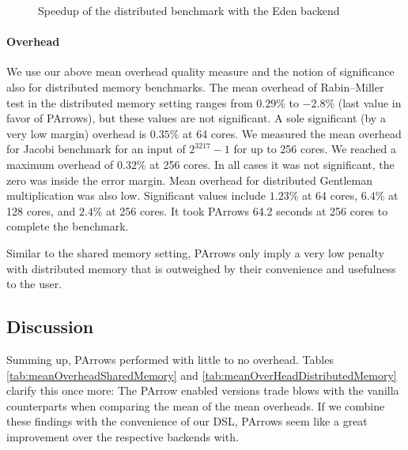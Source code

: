 \begin{figure}[ht]
	\centering
	\caption[Speedup distributed Rabin Miller]{Speedup of the distributed \rmtest benchmark with the Eden backend}
	\label{fig:rabinMillerDistSpeedup}
\end{figure}

\paragraph{Overhead}
We use our above mean overhead quality measure and the notion of significance also for distributed memory benchmarks. The mean overhead of Rabin–Miller test in the distributed memory setting ranges from $0.29\%$ to $-2.8\%$ (last value in favor of PArrows), but these values are not significant. A sole significant (by a very low margin) overhead is $0.35\%$ at 64 cores.
We measured the mean overhead for Jacobi benchmark for an input of $2^{3217}-1$ for up to 256 cores. We reached a maximum overhead of $0.32\%$ at 256 cores. In all cases it was not significant, the zero was inside the error margin.
Mean overhead for distributed Gentleman multiplication was also low. Significant values include $1.23\%$ at 64 cores, $6.4\%$ at 128 cores, and $2.4\%$ at 256 cores. It took PArrows 64.2 seconds at 256 cores to complete the benchmark.

Similar to the shared memory setting, PArrows only imply a very low penalty with distributed memory that is outweighed by their convenience and usefulness to the user.

\subsection{Discussion}



Summing up, PArrows performed with little to no overhead. Tables \ref{tab:meanOverheadSharedMemory} and \ref{tab:meanOverHeadDistributedMemory} clarify this once more: The PArrow enabled versions trade blows with the vanilla counterparts when comparing the mean of the mean overheads. If we combine these findings with the convenience of our DSL, PArrows seem like a great improvement over the respective backends with. 